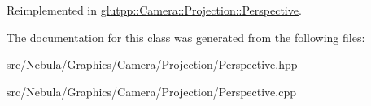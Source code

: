 \-Reimplemented in \hyperlink{classglutpp_1_1Camera_1_1Projection_1_1Perspective_a74771031b253ee639dff1a15e6b9c32d}{glutpp\-::\-Camera\-::\-Projection\-::\-Perspective}.



\-The documentation for this class was generated from the following files\-:\begin{DoxyCompactItemize}
\item 
src/\-Nebula/\-Graphics/\-Camera/\-Projection/\-Perspective.\-hpp\item 
src/\-Nebula/\-Graphics/\-Camera/\-Projection/\-Perspective.\-cpp\end{DoxyCompactItemize}
